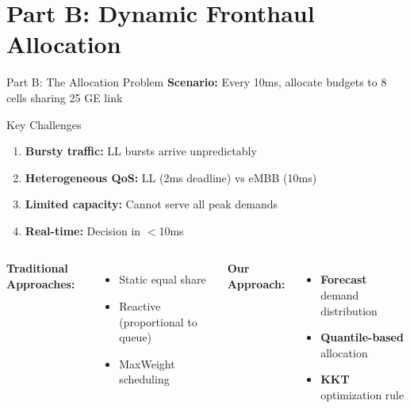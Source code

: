 \documentclass[aspectratio=169]{beamer}
\begin{document}
\section{Part B: Dynamic Fronthaul Allocation}

\begin{frame}{Part B: The Allocation Problem}
\textbf{Scenario:} Every 10ms, allocate budgets to 8 cells sharing 25 GE link

\begin{block}{Key Challenges}
\begin{enumerate}
    \item \textbf{Bursty traffic:} LL bursts arrive unpredictably
    \item \textbf{Heterogeneous QoS:} LL (2ms deadline) vs eMBB (10ms)
    \item \textbf{Limited capacity:} Cannot serve all peak demands
    \item \textbf{Real-time:} Decision in $<$10ms
\end{enumerate}
\end{block}

\begin{columns}
\textbf{Traditional Approaches:}
\begin{itemize}
    \item Static equal share
    \item Reactive (proportional to queue)
    \item MaxWeight scheduling
\end{itemize}

\textbf{Our Approach:}
\begin{itemize}
    \item \textbf{Forecast} demand distribution
    \item \textbf{Quantile-based} allocation
    \item \textbf{KKT} optimization rule
\end{itemize}
\end{columns}
\end{frame}
\end{document}
